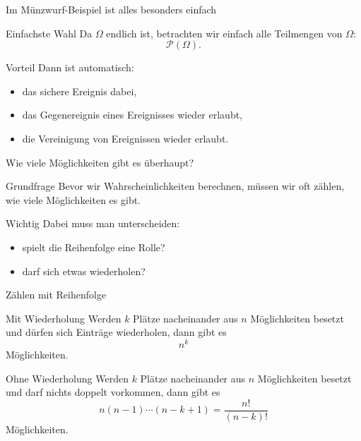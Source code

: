 \documentclass{beamer}
\begin{document}
\begin{frame}{Im Münzwurf-Beispiel ist alles besonders einfach}
\begin{block}{Einfachste Wahl}
Da \(\Omega\) endlich ist, betrachten wir einfach alle Teilmengen von \(\Omega\):
\[
\mathcal P(\Omega).
\]
\end{block}

\begin{block}{Vorteil}
Dann ist automatisch:
\begin{itemize}
    \item das sichere Ereignis dabei,
    \item das Gegenereignis eines Ereignisses wieder erlaubt,
    \item die Vereinigung von Ereignissen wieder erlaubt.
\end{itemize}
\end{block}
\end{frame}


\begin{frame}{Wie viele Möglichkeiten gibt es überhaupt?}
\begin{block}{Grundfrage}
Bevor wir Wahrscheinlichkeiten berechnen, müssen wir oft zählen, wie viele Möglichkeiten es gibt.
\end{block}

\begin{block}{Wichtig}
Dabei muss man unterscheiden:
\begin{itemize}
    \item spielt die Reihenfolge eine Rolle?
    \item darf sich etwas wiederholen?
\end{itemize}
\end{block}
\end{frame}

\begin{frame}{Zählen mit Reihenfolge}
\begin{block}{Mit Wiederholung}
Werden \(k\) Plätze nacheinander aus \(n\) Möglichkeiten besetzt und dürfen sich Einträge wiederholen, dann gibt es
\[
n^k
\]
Möglichkeiten.
\end{block}

\begin{block}{Ohne Wiederholung}
Werden \(k\) Plätze nacheinander aus \(n\) Möglichkeiten besetzt und darf nichts doppelt vorkommen, dann gibt es
\[
n(n-1)\cdots(n-k+1)=\frac{n!}{(n-k)!}
\]
Möglichkeiten.
\end{block}
\end{frame}
\end{document}
